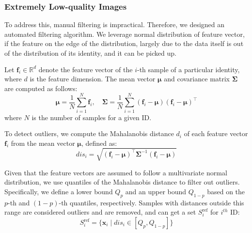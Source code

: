 \subsubsection{Extremely Low-quality Images}

To address this, manual filtering is impractical. Therefore, we designed an automated filtering algorithm. We leverage normal distribution of feature vector, if the feature on the edge of the distribution, largely due to the data itself is out of the distribution of its identity, and it can be picked up. 

Let \( \mathbf{f}_i \in \mathbb{R}^d \) denote the feature vector of the \( i \)-th sample of a particular identity, where \( d \) is the feature dimension. The mean vector \( \boldsymbol{\mu} \) and covariance matrix \( \boldsymbol{\Sigma} \) are computed as follows:
\begin{equation} 
\boldsymbol{\mu} = \frac{1}{N} \sum_{i=1}^{N} \mathbf{f}_i, \quad \boldsymbol{\Sigma} = \frac{1}{N} \sum_{i=1}^{N} (\mathbf{f}_i - \boldsymbol{\mu})(\mathbf{f}_i - \boldsymbol{\mu})^\top
\end{equation}
where \( N \) is the number of samples for a given ID.

To detect outliers, we compute the Mahalanobis distance \( d_i \) of each feature vector \( \mathbf{f}_i \) from the mean vector \( \boldsymbol{\mu} \), defined as:
\begin{equation}
dis_i = \sqrt{ (\mathbf{f}_i - \boldsymbol{\mu})^\top \boldsymbol{\Sigma}^{-1} (\mathbf{f}_i - \boldsymbol{\mu}) }
\end{equation}

Given that the feature vectors are assumed to follow a multivariate normal distribution, we use quantiles of the Mahalanobis distance to filter out outliers. Specifically, we define a lower bound \( Q_p \) and an upper bound \( Q_{1-p} \) based on the \( p \)-th and \( (1 - p) \)-th quantiles, respectively. Samples with distances outside this range are considered outliers and are removed, and can get a set $S^{\text{ref}}_{i}$ for $i^{th}$ ID:
\begin{equation} \label{outliers}
S_i^{\text{ref}} = \{ \mathbf{x}_i \mid dis_i \in [Q_p, Q_{1-p}] \}
\end{equation}



